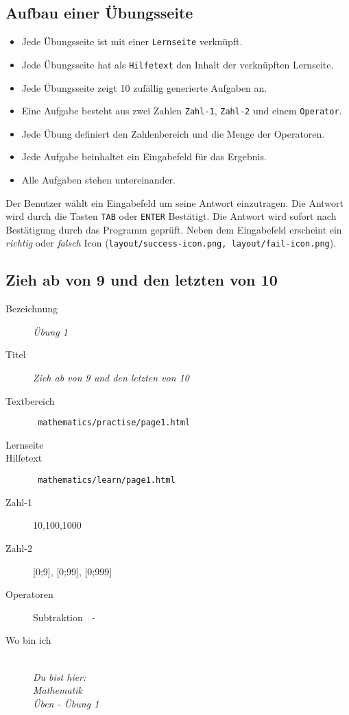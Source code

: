 \subsection{ Aufbau einer Übungsseite }
\label{cha:math-practise-structure}
\begin{itemize}
  \item Jede Übungsseite ist mit einer \texttt{Lernseite} verknüpft.
  \item Jede Übungsseite hat als \texttt{Hilfetext} den Inhalt der verknüpften Lernseite.
  \item Jede Übungsseite zeigt 10 zufällig generierte Aufgaben an.
  \item Eine Aufgabe besteht aus zwei Zahlen \texttt{Zahl-1}, \texttt{Zahl-2} und einem \texttt{Operator}.
  \item Jede Übung definiert den Zahlenbereich und die Menge der Operatoren.
  \item Jede Aufgabe beinhaltet ein Eingabefeld für das Ergebnis.
  \item Alle Aufgaben stehen untereinander.
\end{itemize}

Der Benutzer wählt ein Eingabefeld um seine Antwort einzutragen. 
Die Antwort wird durch die Tasten \texttt{TAB} oder \texttt{ENTER} Bestätigt. 
Die Antwort wird sofort nach Bestätigung durch das Programm geprüft. 
Neben dem Eingabefeld erscheint ein \emph{richtig} oder \emph{falsch} Icon (\texttt{layout/success-icon.png, layout/fail-icon.png}).



\subsection{ Zieh ab von 9 und den letzten von 10 }
\label{cha:math-practise-page1}
\begin{description}
  \item[Bezeichnung] \emph{ Übung 1 }
  \item[Titel] \emph{ Zieh ab von 9 und den letzten von 10 }
  \item[Textbereich] \texttt{ mathematics/practise/page1.html }
  \item[Lernseite] 
  \item[Hilfetext] \texttt{ mathematics/learn/page1.html }
  \item[Zahl-1] {10,100,1000}
  \item[Zahl-2] {[0;9], [0;99], [0;999]}
  \item[Operatoren] Subtraktion \texttt{ - }
  \item[Wo bin ich] \emph{\\Du bist hier:\\Mathematik\\Üben - Übung 1}
\end{description}



